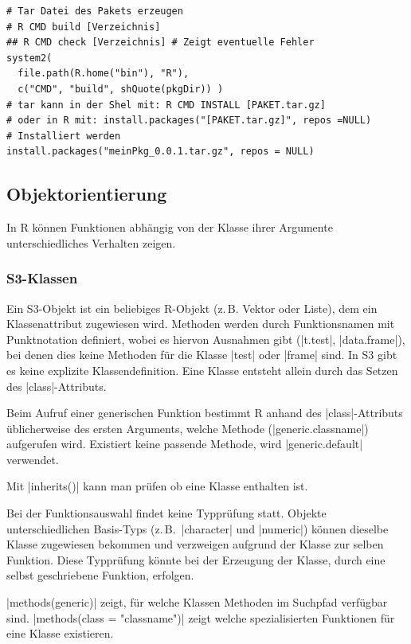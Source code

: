 \documentclass[10pt,twocolumn]{scrartcl}
\renewcommand{\lstinline}{\mycoloredinline}
\begin{document}
\begin{lstlisting}
# Tar Datei des Pakets erzeugen
# R CMD build [Verzeichnis]
## R CMD check [Verzeichnis] # Zeigt eventuelle Fehler
system2(
  file.path(R.home("bin"), "R"),
  c("CMD", "build", shQuote(pkgDir)) )
# tar kann in der Shel mit: R CMD INSTALL [PAKET.tar.gz]
# oder in R mit: install.packages("[PAKET.tar.gz]", repos =NULL)
# Installiert werden
install.packages("meinPkg_0.0.1.tar.gz", repos = NULL)
\end{lstlisting}


\subsection{Objektorientierung}

In R können Funktionen abhängig von der Klasse ihrer Argumente unterschiedliches Verhalten zeigen.


\subsubsection{S3-Klassen}

Ein S3-Objekt ist ein beliebiges R-Objekt (z.\,B. Vektor oder Liste), dem ein Klassenattribut zugewiesen wird.  Methoden werden durch Funktionsnamen mit Punktnotation definiert, wobei es hiervon Ausnahmen gibt (\lstinline|t.test|, \lstinline|data.frame|), bei denen dies keine Methoden für die Klasse \lstinline|test| oder \lstinline|frame| sind.  In S3 gibt es keine explizite Klassendefinition.  Eine Klasse entsteht allein durch das Setzen des \lstinline|class|-Attributs.

Beim Aufruf einer generischen Funktion bestimmt R anhand des \lstinline|class|-Attributs üblicherweise des ersten Arguments, welche Methode (\lstinline|generic.classname|) aufgerufen wird. Existiert keine passende Methode, wird \lstinline|generic.default| verwendet.

Mit \lstinline|inherits()| kann man prüfen ob eine Klasse enthalten ist.

Bei der Funktionsauswahl findet keine Typprüfung statt. Objekte unterschiedlichen Basis-Typs (z.\,B.\ \lstinline|character| und \lstinline|numeric|) können dieselbe Klasse zugewiesen bekommen und verzweigen aufgrund der Klasse zur selben Funktion. Diese Typprüfung könnte bei der Erzeugung der Klasse, durch eine selbst geschriebene Funktion, erfolgen.

\lstinline|methods(generic)| zeigt, für welche Klassen Methoden im Suchpfad verfügbar sind. \lstinline|methods(class = "classname")| zeigt welche spezialisierten Funktionen für eine Klasse existieren.
\end{document}
